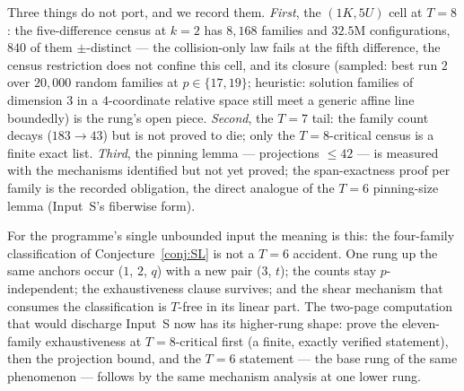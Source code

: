 Three things do not port, and we record them. \emph{First}, the
$(1K,5U)$ cell at $T=8$: the five-difference census at $k=2$ has $8{,}168$
families and $32.5$M configurations, $840$ of them $\pm$-distinct --- the
collision-only law fails at the fifth difference, the census restriction
does not confine this cell, and its closure (sampled: best run $2$ over
$20{,}000$ random families at $p\in\{17,19\}$; heuristic: solution
families of dimension $3$ in a $4$-coordinate relative space still meet a
generic affine line boundedly) is the rung's open piece. \emph{Second},
the $T=7$ tail: the family count decays ($183\to43$) but is not proved
to die; only the $T=8$-critical census is a finite exact list.
\emph{Third}, the pinning lemma --- projections $\le42$ --- is measured
with the mechanisms identified but not yet proved; the span-exactness
proof per family is the recorded obligation, the direct analogue of the
$T=6$ pinning-size lemma (Input~S's fiberwise form).

For the programme's single unbounded input the meaning is this: the
four-family classification of Conjecture~\ref{conj:SL} is not a $T=6$
accident. One rung up the same anchors occur ($1$, $2$, $q$) with a new
pair ($3$, $t$); the counts stay $p$-independent; the exhaustiveness
clause survives; and the shear mechanism that consumes the
classification is $T$-free in its linear part. The two-page computation
that would discharge Input~S now has its higher-rung shape: prove the
eleven-family exhaustiveness at $T=8$-critical first (a finite, exactly
verified statement), then the projection bound, and the $T=6$ statement
--- the base rung of the same phenomenon --- follows by the same
mechanism analysis at one lower rung.

